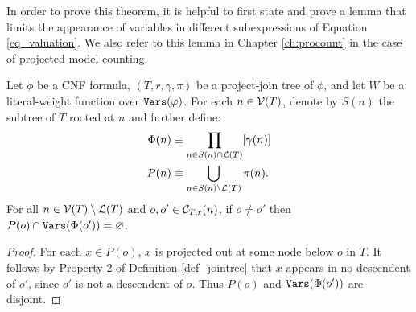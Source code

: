 In order to prove this theorem, it is helpful to first state and prove a lemma that limits the appearance of variables in different subexpressions of Equation \ref{eq_valuation}. We also refer to this lemma in Chapter \ref{ch:procount} in the case of projected model counting.
\begin{lemma}
\label{lemma:projections_branch_disjoint}
Let $\phi$ be a CNF formula, $(T, r, \gamma, \pi)$ be a project-join tree of $\phi$, and let $W$ be a literal-weight function over $\texttt{\upshape Vars}(\varphi)$. For each $n \in \mathcal{V}(T)$, denote by $S(n)$ the subtree of $T$ rooted at $n$ and further define:
\begin{align*}
    \Phi(n) &\equiv \prod_{n \in S(n) \cap \mathcal{L}(T)} [\gamma(n)] \\
    P(n) &\equiv \bigcup_{n \in S(n) \setminus \mathcal{L}(T)} \pi(n).
\end{align*}
For all $n \in \mathcal{V}(T) \setminus \mathcal{L}(T)$ and $o, o' \in \mathcal{C}_{T,r}(n)$, if $o \neq o'$ then $P(o) \cap \texttt{\upshape Vars}(\Phi(o')) = \varnothing$.
\end{lemma}
\begin{proof}
For each $x \in P(o)$, $x$ is projected out at some node below $o$ in $T$. It follows by Property 2 of Definition \ref{def_jointree} that $x$ appears in no descendent of $o'$, since $o'$ is not a descendent of $o$. Thus $P(o)$ and $\texttt{\upshape Vars}(\Phi(o'))$ are disjoint.
\end{proof}

